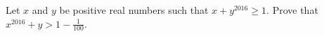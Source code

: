 Let $x$ and $y$ be positive real numbers such that $x+y^{2016}\geq 1$. Prove that $x^{2016}+y> 1-\frac{1}{100}$.